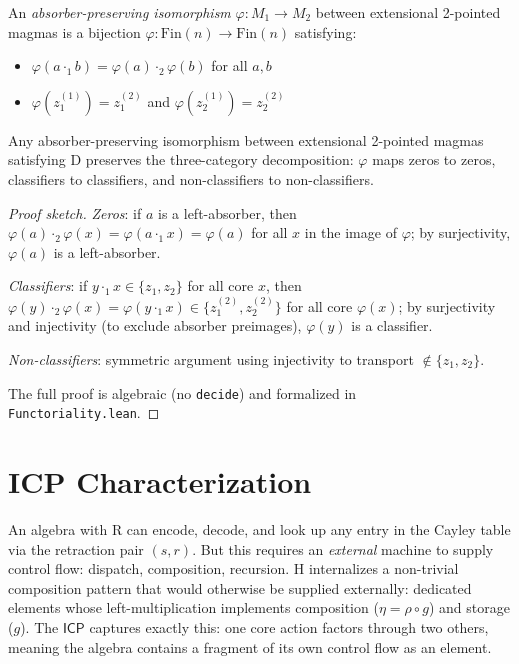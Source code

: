 \documentclass[sigconf,screen,review,anonymous]{acmart}
\newcommand{\dotop}{\cdot}
\newcommand{\ICP}{\textsf{ICP}}
\newcommand{\Fin}{\mathrm{Fin}}
\theoremstyle{remark}
\begin{document}
\begin{definition}
An \emph{absorber-preserving isomorphism} $\varphi : M_1 \to M_2$ between extensional 2-pointed magmas is a bijection $\varphi : \Fin(n) \to \Fin(n)$ satisfying:
\begin{itemize}
  \item $\varphi(a \dotop_1 b) = \varphi(a) \dotop_2 \varphi(b)$ for all $a, b$
  \item $\varphi(z_1^{(1)}) = z_1^{(2)}$ and $\varphi(z_2^{(1)}) = z_2^{(2)}$
\end{itemize}
\end{definition}

\begin{theorem}[Functoriality]
\label{thm:functoriality}
Any absorber-preserving isomorphism between extensional 2-pointed magmas satisfying D preserves the three-category decomposition: $\varphi$ maps zeros to zeros, classifiers to classifiers, and non-classifiers to non-classifiers.
\end{theorem}

\begin{proof}[Proof sketch]
\emph{Zeros}: if $a$ is a left-absorber, then $\varphi(a) \dotop_2 \varphi(x) = \varphi(a \dotop_1 x) = \varphi(a)$ for all $x$ in the image of $\varphi$; by surjectivity, $\varphi(a)$ is a left-absorber.

\emph{Classifiers}: if $y \dotop_1 x \in \{z_1, z_2\}$ for all core $x$, then $\varphi(y) \dotop_2 \varphi(x) = \varphi(y \dotop_1 x) \in \{z_1^{(2)}, z_2^{(2)}\}$ for all core $\varphi(x)$; by surjectivity and injectivity (to exclude absorber preimages), $\varphi(y)$ is a classifier.

\emph{Non-classifiers}: symmetric argument using injectivity to transport $\notin \{z_1, z_2\}$.

The full proof is algebraic (no \texttt{decide}) and formalized in \texttt{Functoriality.lean}.
\end{proof}

\section{ICP Characterization}
\label{sec:icp}

An algebra with R can encode, decode, and look up any entry in the Cayley table via the retraction pair $(s, r)$. But this requires an \emph{external} machine to supply control flow: dispatch, composition, recursion. H internalizes a non-trivial composition pattern that would otherwise be supplied externally: dedicated elements whose left-multiplication implements composition ($\eta = \rho \circ g$) and storage ($g$). The $\ICP$ captures exactly this: one core action factors through two others, meaning the algebra contains a fragment of its own control flow as an element.
\end{document}

